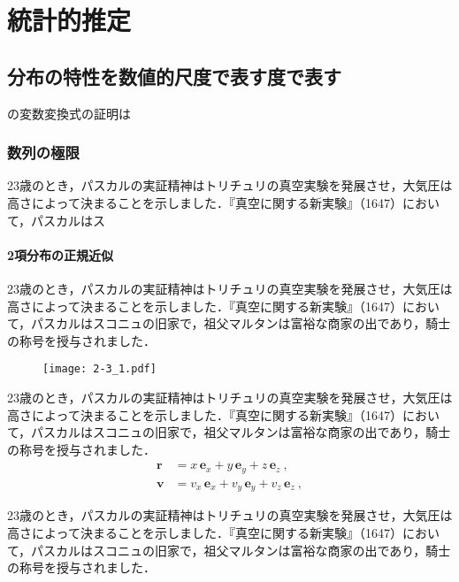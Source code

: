 \chapter{統計的推定}

\begin{abstract}
\S4 の変数変換式の証明は完全ではない．完全な証明はあとがきの文献を見ていただきたい．多変数関数の積分のことを\textbf{重積分}ともいう．
\end{abstract}


\section{分布の特性を数値的尺度で表す度で表す}
の変数変換式の証明は
\subsection{数列の極限}


23歳のとき，パスカルの実証精神はトリチュリの真空実験を発展させ，大気圧は高さによって決まることを示しました．『真空に関する新実験』（1647）において，パスカルはス
\subsubsection{2項分布の正規近似}

\begin{証明}
23歳のとき，パスカルの実証精神はトリチュリの真空実験を発展させ，大気圧は高さによって決まることを示しました．『真空に関する新実験』（1647）において，パスカルはスコニュの旧家で，祖父マルタンは富裕な商家の出であり，騎士の称号を授与されました．\end{証明}

\begin{figure}[h!]
\centering
\texttt{[image: 2-3\_1.pdf]}
\caption{}\label{fig:C1:01}
\end{figure}
\begin{証明*}
23歳のとき，パスカルの実証精神はトリチュリの真空実験を発展させ，大気圧は高さによって決まることを示しました．『真空に関する新実験』（1647）において，パスカルはスコニュの旧家で，祖父マルタンは富裕な商家の出であり，騎士の称号を授与されました．\begin{align*}
\bm{r}&=x\,\bm{e}_x+y\,\bm{e}_y+z\,\bm{e}_z\ ,\\
\bm{v}&=v_x\,\bm{e}_x+v_y\,\bm{e}_y+v_z\,\bm{e}_z\ ,\tag*{\QED}
\end{align*}
\end{証明*}

\begin{定義}
23歳のとき，パスカルの実証精神はトリチュリの真空実験を発展させ，大気圧は高さによって決まることを示しました．『真空に関する新実験』（1647）において，パスカルはスコニュの旧家で，祖父マルタンは富裕な商家の出であり，騎士の称号を授与されました．\end{定義}

